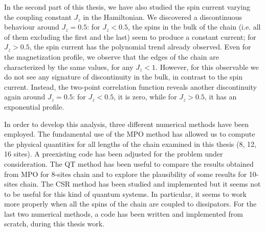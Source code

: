 In the second part of this thesis, we have also studied the spin current varying the coupling constant $J_z$ in the Hamiltonian. We discovered a discontinuous behaviour around $J_z = 0.5$: for $J_z < 0.5$, %
the spins in the bulk of the chain (i.e. all of them excluding the first and the last) seem to produce a constant current; for $J_z > 0.5$, the spin current has the polynomial trend already observed. Even for the magnetization profile, we observe that the edges of the chain are characterized by the same values, for any $J_z<1$. However, for this observable we do not see any signature of discontinuity in the bulk, in contrast to the spin current. Instead, the two-point correlation function reveals another discontinuity again around $J_z = 0.5$: for $J_z < 0.5$, it is zero, while for $J_z > 0.5$, it has an exponential profile.

In order to develop this analysis, three different numerical methods have been employed.  The fundamental use of the MPO method has allowed us to compute the physical quantities for all lengths of the chain examined in this thesis (8, 12, 16 sites). A preexisting code has been adjusted for the problem under consideration. The QT method has been useful to compare the results obtained from MPO for 8-sites chain and to explore the plausibility of some results for 10-sites chain. The CSR method has been studied and implemented but it seems not to be useful for this kind of quantum systems. In particular, it seems to work more properly when all the spins of the chain are coupled to dissipators. For the last two numerical methods, a code has been written and implemented from scratch, during this thesis work.



